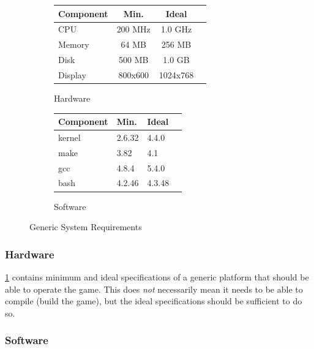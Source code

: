 \documentclass[letterpaper]{article}
\begin{document}
\begin{figure}
    \centering
    \begin{subfigure}{.50\textwidth}
        \centering
        \begin{tabular}{l*{2}{c}r}
            Component & Min.    & Ideal    \\
            \hline
            CPU       & 200 MHz & 1.0 GHz  \\
            Memory    &  64 MB  & 256 MB   \\
            Disk      & 500 MB  & 1.0 GB   \\
            Display   & 800x600 & 1024x768 \\
        \end{tabular}
        \caption{Hardware}
        \label{fig:design_assumptions_hard}
    \end{subfigure}%
    \begin{subfigure}{.50\textwidth}
        \centering
        \begin{tabular}{l*{2}{l}r}
            Component & Min.   & Ideal  \\
            \hline
            kernel    & 2.6.32 & 4.4.0  \\
            make      & 3.82   & 4.1    \\
            gcc       & 4.8.4  & 5.4.0  \\
            bash      & 4.2.46 & 4.3.48 \\
        \end{tabular}
        \caption{Software}
        \label{fig:design_assumptions_soft}
    \end{subfigure}
    \caption{Generic System Requirements}
    \label{fig:design_assumptions}
\end{figure}

\subsubsection{Hardware}
\label{sec:design_assumptions_hard}

\cref{fig:design_assumptions_hard} contains minimum and ideal
specifications of a generic platform that should be able to
operate the game. This does \emph{not} necessarily mean it needs
to be able to compile (build the game), but the ideal
specifications should be sufficient to do so.

\subsubsection{Software}
\label{sec:design_assumptions_soft}
\end{document}
